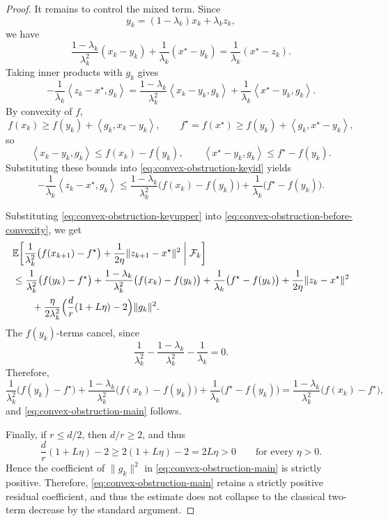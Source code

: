 \documentclass[10pt]{article}
\newcommand{\E}{\mathbb{E}}
\newcommand{\F}{\mathcal{F}}
\newcommand{\ip}[2]{\left\langle #1,#2\right\rangle}
\begin{document}
\begin{proof}
It remains to control the mixed term. Since
\[
y_k=(1-\lambda_k)x_k+\lambda_k z_k,
\]
we have
\[
\frac{1-\lambda_k}{\lambda_k^2}(x_k-y_k)
+\frac{1}{\lambda_k}(x^\star-y_k)
=
\frac{1}{\lambda_k}(x^\star-z_k).
\]
Taking inner products with \(g_k\) gives
\begin{equation}
-\frac{1}{\lambda_k}\ip{z_k-x^\star}{g_k}
=
\frac{1-\lambda_k}{\lambda_k^2}\ip{x_k-y_k}{g_k}
+\frac{1}{\lambda_k}\ip{x^\star-y_k}{g_k}.
\label{eq:convex-obstruction-keyid}
\end{equation}
By convexity of \(f\),
\[
f(x_k)\ge f(y_k)+\ip{g_k}{x_k-y_k},
\qquad
f^\star=f(x^\star)\ge f(y_k)+\ip{g_k}{x^\star-y_k},
\]
so
\[
\ip{x_k-y_k}{g_k}\le f(x_k)-f(y_k),
\qquad
\ip{x^\star-y_k}{g_k}\le f^\star-f(y_k).
\]
Substituting these bounds into \eqref{eq:convex-obstruction-keyid} yields
\begin{equation}
-\frac{1}{\lambda_k}\ip{z_k-x^\star}{g_k}
\le
\frac{1-\lambda_k}{\lambda_k^2}\bigl(f(x_k)-f(y_k)\bigr)
+
\frac{1}{\lambda_k}\bigl(f^\star-f(y_k)\bigr).
\label{eq:convex-obstruction-keyupper}
\end{equation}

Substituting \eqref{eq:convex-obstruction-keyupper} into
\eqref{eq:convex-obstruction-before-convexity}, we get
\begin{align*}
&\E\!\left[
\frac{1}{\lambda_k^2}\bigl(f(x_{k+1})-f^\star\bigr)
+\frac{1}{2\eta}\|z_{k+1}-x^\star\|^2
\;\middle|\;\F_k
\right] \\
&\le
\frac{1}{\lambda_k^2}\bigl(f(y_k)-f^\star\bigr)
+\frac{1-\lambda_k}{\lambda_k^2}\bigl(f(x_k)-f(y_k)\bigr)
+\frac{1}{\lambda_k}\bigl(f^\star-f(y_k)\bigr)
+\frac{1}{2\eta}\|z_k-x^\star\|^2 \\
&\qquad
+\frac{\eta}{2\lambda_k^2}
\Bigl(
\frac{d}{r}(1+L\eta)-2
\Bigr)\|g_k\|^2.
\end{align*}
The \(f(y_k)\)-terms cancel, since
\[
\frac{1}{\lambda_k^2}
-\frac{1-\lambda_k}{\lambda_k^2}
-\frac{1}{\lambda_k}
=0.
\]
Therefore,
\[
\frac{1}{\lambda_k^2}\bigl(f(y_k)-f^\star\bigr)
+\frac{1-\lambda_k}{\lambda_k^2}\bigl(f(x_k)-f(y_k)\bigr)
+\frac{1}{\lambda_k}\bigl(f^\star-f(y_k)\bigr)
=
\frac{1-\lambda_k}{\lambda_k^2}\bigl(f(x_k)-f^\star\bigr),
\]
and \eqref{eq:convex-obstruction-main} follows.

Finally, if \(r\le d/2\), then \(d/r\ge2\), and thus
\[
\frac{d}{r}(1+L\eta)-2
\ge
2(1+L\eta)-2
=
2L\eta
>
0
\qquad
\text{for every }\eta>0.
\]
Hence the coefficient of \(\|g_k\|^2\) in \eqref{eq:convex-obstruction-main} is strictly positive.
Therefore, \eqref{eq:convex-obstruction-main} retains a strictly positive residual coefficient, and thus the estimate does not collapse to the classical two-term decrease by the standard argument.
\end{proof}
\end{document}
